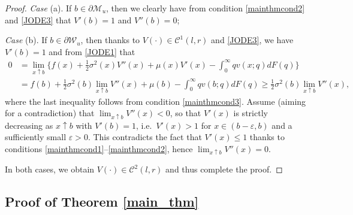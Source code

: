 \documentclass[11pt]{article} %
\numberwithin{komcounter}{section}
\begin{document}
\begin{proof}
{\it Case} (a). If $b \in \partial\mathcal{M}_u$, then we clearly have from condition \eqref{mainthmcond2} and \eqref{JODE3} that $V'(b)=1$ and $V''(b)=0$; 

{\it Case} (b). If $b \in \partial\mathcal{W}_u$, then thanks to $V(\cdot) \in  \mathcal{C}^1(l,r)$ and \eqref{JODE3}, we have $V'(b)=1$ and from \eqref{JODE1} that 
\begin{align*}
0 &= \lim_{x \uparrow b} \Big\{f(x) + \frac12 \sigma^2(x) V''(x) + \mu(x) V'(x) - \textstyle{\int_{0}^{\infty}} q v(x;q) dF(q) \Big\} \\
&= f(b) + \frac12 \sigma^2(b) \lim_{x \uparrow b} V''(x) + \mu(b) - \textstyle{\int_{0}^{\infty}} q v(b;q) dF(q) 
\geq \frac12 \sigma^2(b) \lim_{x \uparrow b} V''(x),
\end{align*}
where the last inequality follows from condition \eqref{mainthmcond3}.
Assume (aiming for a contradiction) that $\lim_{x \uparrow b} V''(x) < 0$, so that $V'(x)$ is strictly decreasing as $x \uparrow b$ with $V'(b)=1$, i.e.~$V'(x) > 1$ for $x\in(b-\varepsilon, b)$ and a sufficiently small $\varepsilon>0$. 
This contradicts the fact that $V'(x) \leq 1$ thanks to conditions \eqref{mainthmcond1}--\eqref{mainthmcond2}, hence 
$\lim_{x \uparrow b} V''(x) = 0$. 

In both cases, we obtain $V(\cdot)\in \mathcal{C}^2(l,r)$ and thus complete the proof. 
\end{proof}
 


\subsection{Proof of Theorem \ref{main_thm}}\label{main_thm:proof-section}
\end{document}
